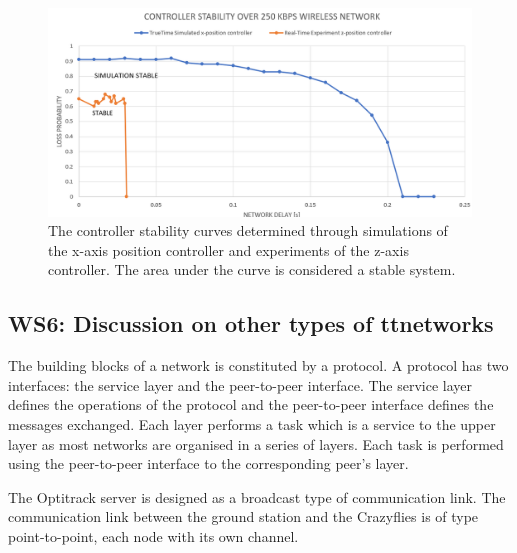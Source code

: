 \begin{figure}[H]
\centering
 \includegraphics[scale=0.65]{Figures/controller_stability_line.png}
 \caption{The controller stability curves determined through simulations of the x-axis position controller and experiments of the z-axis controller. The area under the curve is considered a stable system.}
 \label{figure:stability_curve}
\end{figure}


\subsection{WS6: Discussion on other types of ttnetworks}

The building blocks of a network is constituted by a protocol. A protocol has two interfaces: the service layer and the peer-to-peer interface. The service layer defines the operations of the protocol and the peer-to-peer interface defines the messages exchanged. Each layer performs a task which is a service to the upper layer as most networks are organised in a series of layers. Each task is performed using the peer-to-peer interface to the corresponding peer's layer.

The Optitrack server is designed as a broadcast type of communication link.
The communication link between the ground station and the Crazyflies is of type point-to-point, each node with its own channel.

